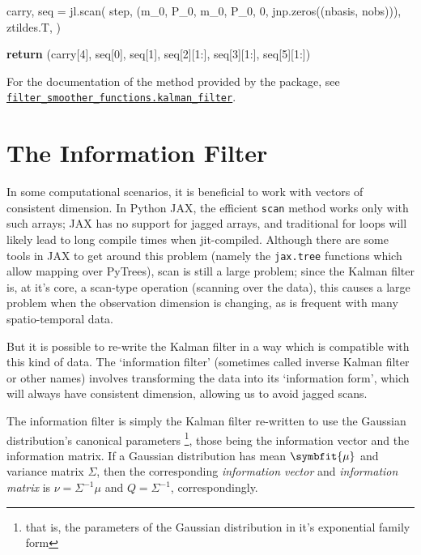 \documentclass[
]{report}
\newenvironment{Shaded}{\begin{snugshade}}{\end{snugshade}}
\newcommand{\ControlFlowTok}[1]{\textcolor[rgb]{0.00,0.23,0.31}{\textbf{#1}}}
\newcommand{\DecValTok}[1]{\textcolor[rgb]{0.68,0.00,0.00}{#1}}
\newcommand{\NormalTok}[1]{\textcolor[rgb]{0.00,0.23,0.31}{#1}}
\newcommand{\OperatorTok}[1]{\textcolor[rgb]{0.37,0.37,0.37}{#1}}
\newcommand{\bv}[1]{\symbfit{#1}}
\theoremstyle{plain}
\theoremstyle{plain}
\theoremstyle{plain}
\theoremstyle{remark}
\begin{document}
\begin{Shaded}
\begin{Highlighting}[]
\NormalTok{    carry, seq }\OperatorTok{=}\NormalTok{ jl.scan(}
\NormalTok{        step,}
\NormalTok{        (m\_0, P\_0, m\_0, P\_0, }\DecValTok{0}\NormalTok{, jnp.zeros((nbasis, nobs))),}
\NormalTok{        ztildes.T,}
\NormalTok{    )}

    \ControlFlowTok{return}\NormalTok{ (carry[}\DecValTok{4}\NormalTok{], seq[}\DecValTok{0}\NormalTok{], seq[}\DecValTok{1}\NormalTok{], seq[}\DecValTok{2}\NormalTok{][}\DecValTok{1}\NormalTok{:], seq[}\DecValTok{3}\NormalTok{][}\DecValTok{1}\NormalTok{:], seq[}\DecValTok{5}\NormalTok{][}\DecValTok{1}\NormalTok{:])}
\end{Highlighting}
\end{Shaded}

\normalsize

For the documentation of the method provided by the package, see
\href{../reference/kalman_filter.html}{\texttt{filter\_smoother\_functions.kalman\_filter}}.

\section{The Information Filter}\label{the-information-filter}

In some computational scenarios, it is beneficial to work with vectors
of consistent dimension. In Python JAX, the efficient \texttt{scan}
method works only with such arrays; JAX has no support for jagged
arrays, and traditional for loops will likely lead to long compile times
when jit-compiled. Although there are some tools in JAX to get around
this problem (namely the \texttt{jax.tree} functions which allow mapping
over PyTrees), scan is still a large problem; since the Kalman filter
is, at it's core, a scan-type operation (scanning over the data), this
causes a large problem when the observation dimension is changing, as is
frequent with many spatio-temporal data.

But it is possible to re-write the Kalman filter in a way which is
compatible with this kind of data. The `information filter' (sometimes
called inverse Kalman filter or other names) involves transforming the
data into its `information form', which will always have consistent
dimension, allowing us to avoid jagged scans.

The information filter is simply the Kalman filter re-written to use the
Gaussian distribution's canonical parameters \footnote{that is, the
  parameters of the Gaussian distribution in it's exponential family
  form}, those being the information vector and the information matrix.
If a Gaussian distribution has mean \(\bv\mu\) and variance matrix
\(\Sigma\), then the corresponding \emph{information vector} and
\emph{information matrix} is \(\nu = \Sigma^{-1}\mu\) and
\(Q = \Sigma^{-1}\), correspondingly.
\end{document}
